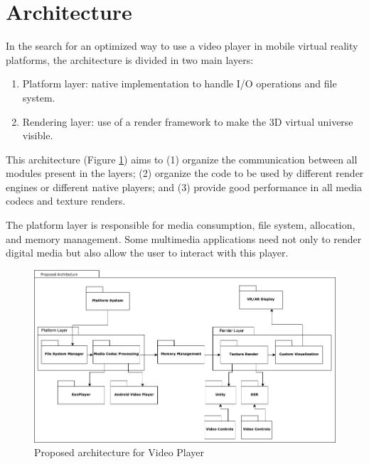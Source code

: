 \documentclass[runningheads]{llncs}
\begin{document}
\section{Architecture} \label{architecture}



In the search for an optimized way to use a video player in mobile virtual reality platforms, the architecture is divided in two main layers:

\begin{enumerate}
    \item Platform layer: native implementation to handle I/O operations and file system.
    \item Rendering layer: use of a render framework to make the 3D virtual universe visible.
\end{enumerate}

This architecture (Figure \ref{fig-video-player-arch}) aims to (1) organize the communication between all modules present in the layers; (2) organize the code to be used by different render engines or different native players; and (3) provide good performance in all media codecs and texture renders.

The platform layer is responsible for media consumption, file system, allocation, and memory management. Some multimedia applications need not only to render digital media but also allow the user to interact with this player.

\begin{figure}[h]
    \centering
    \includegraphics[width=\textwidth]{images/ProposedArch.png}
    \caption{Proposed architecture for Video Player}
    \label{fig-video-player-arch}
\end{figure}
\end{document}
